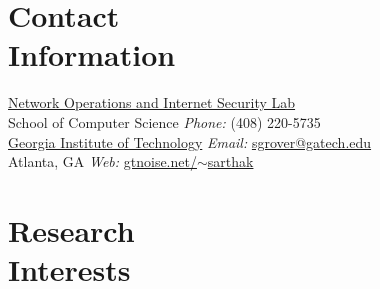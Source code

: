 \documentclass[margin,line]{resume}
\begin{document}
\begin{resume}

% 
    \section{\mysidestyle \normalsize Contact\\Information}

    \href{http://gtnoise.net/}{Network Operations and Internet Security Lab}	\\
    School of Computer Science    \hfill \emph{Phone:} (408) 220-5735\\
    \href{http://www.gatech.edu/}{Georgia Institute of Technology}	\hfill \emph{Email:} \href{mailto:sgrover@gatech.edu}{sgrover@gatech.edu}\\
    Atlanta, GA		\hfill \emph{Web:} \href{http://gtnoise.net/~sarthak}{gtnoise.net/{\tiny$\sim$}sarthak}	\\\vspace{-4.5mm}




    \section{\mysidestyle \normalsize Research\\Interests}


\end{resume}
\end{document}
